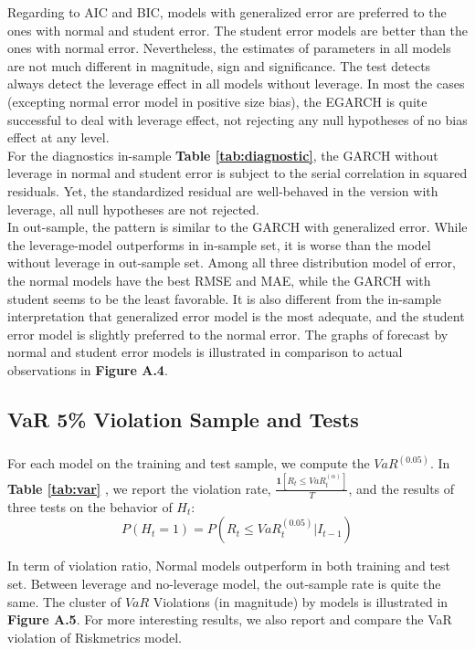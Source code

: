 \documentclass[a4paper]{article}
\begin{document}
Regarding to AIC and BIC, models with generalized error are preferred to the ones with normal and student error. The student error models are better than the ones with normal error. Nevertheless, the estimates of parameters in all models are not much different in magnitude, sign and significance. 
The test detects always detect the leverage effect in all models without leverage. In most the cases (excepting normal error model in positive size bias), the EGARCH is quite successful to deal with leverage effect, not rejecting any null hypotheses of no bias effect at any level. \\

For the diagnostics in-sample \textbf{Table \ref{tab:diagnostic}}, the GARCH without leverage in normal and student error is subject to the serial correlation in squared residuals. Yet, the standardized residual are well-behaved in the version with leverage, all null hypotheses are not rejected. \\

In out-sample, the pattern is similar to the GARCH with generalized error. While the leverage-model outperforms in in-sample set, it is worse than the model without leverage in out-sample set. Among all three distribution model of error, the normal models have the best RMSE and MAE, while the GARCH with student seems to be the least favorable. It is also different from the in-sample interpretation that generalized error model is the most adequate, and the student error model is slightly preferred to the normal error. The graphs of forecast by normal and student error models is illustrated in comparison to actual observations in \textbf{Figure A.4}. 


\subsection{VaR 5\% Violation Sample and Tests}

\subparagraph*{}
For each model on the training and test sample, we compute the $VaR^{(0.05)}$. In \textbf{Table \ref{tab:var} }, we report the violation rate, $\frac{\mathbf{1}\left[R_t \leq VaR_t^{(\alpha)}\right]}{T}$, and the results of three tests on the behavior of $H_t$:
\[P(H_t = 1) = P(R_t \leq VaR_t^{(0.05)} | I_{t-1})\]

In term of violation ratio, Normal models outperform in both training and test set. Between leverage and no-leverage model, the out-sample rate is quite the same. The cluster of $VaR$ Violations (in magnitude) by models is illustrated in \textbf{Figure A.5}. For more interesting results, we also report and compare the VaR violation of Riskmetrics model. \\
\end{document}
